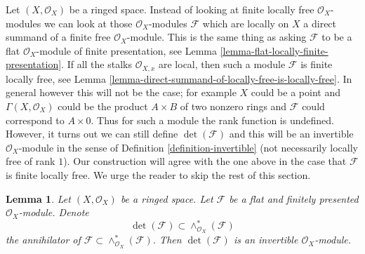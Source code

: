 \documentclass{stacks-project}
\theoremstyle{plain}
\newtheorem{lemma}[subsection]{Lemma}
\theoremstyle{definition}
\theoremstyle{remark}
\numberwithin{equation}{subsection}
\begin{document}
\noindent
Let $(X, \mathcal{O}_X)$ be a ringed space. Instead of looking at
finite locally free $\mathcal{O}_X$-modules we can look at those
$\mathcal{O}_X$-modules $\mathcal{F}$ which are locally on $X$
a direct summand of a finite free $\mathcal{O}_X$-module. This is the same
thing as asking $\mathcal{F}$ to be a flat $\mathcal{O}_X$-module of
finite presentation, see Lemma \ref{lemma-flat-locally-finite-presentation}.
If all the stalks $\mathcal{O}_{X, x}$ are local, then such a module
$\mathcal{F}$ is finite locally free, see
Lemma \ref{lemma-direct-summand-of-locally-free-is-locally-free}.
In general however this will not be the case; for
example $X$ could be a point and $\Gamma(X, \mathcal{O}_X)$ could
be the product $A \times B$ of two nonzero rings and $\mathcal{F}$
could correspond to $A \times 0$.
Thus for such a module the rank function is undefined.
However, it turns out we can still define $\det(\mathcal{F})$
and this will be an invertible $\mathcal{O}_X$-module in the sense of
Definition \ref{definition-invertible} (not necessarily locally
free of rank $1$). Our construction will agree with the one above
in the case that $\mathcal{F}$ is finite locally free.
We urge the reader to skip the rest of this section.

\begin{lemma}
\label{lemma-determinant-as-socle}
Let $(X, \mathcal{O}_X)$ be a ringed space. Let $\mathcal{F}$
be a flat and finitely presented $\mathcal{O}_X$-module.
Denote
$$
\det(\mathcal{F}) \subset
\wedge^*_{\mathcal{O}_X}(\mathcal{F})
$$
the annihilator of $\mathcal{F} \subset \wedge^*_{\mathcal{O}_X}(\mathcal{F})$.
Then $\det(\mathcal{F})$ is an invertible $\mathcal{O}_X$-module.
\end{lemma}
\end{document}
